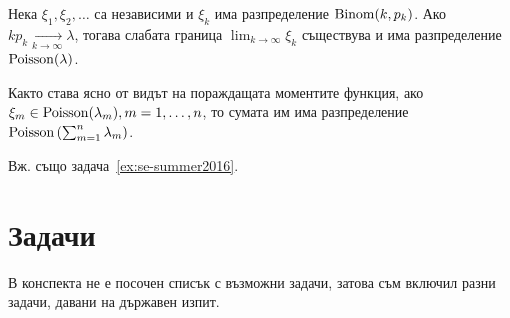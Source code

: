 \documentclass[numbers=endperiod, DIV=15, bibliography=totocnumbered]{scrartcl}
\begin{document}
\begin{theorem}[Поасон]\label{thm:poisson}
  Нека $\xi_1, \xi_2, \ldots$ са независими и $\xi_k$ има разпределение $\operatorname{Binom}(k, p_k)$. Ако $k p_k \underset {k \to \infty} \longrightarrow \lambda$, тогава слабата граница $\lim_{k \to \infty} \xi_k$ съществува и има разпределение $\operatorname{Poisson}(\lambda)$.
\end{theorem}

Както става ясно от видът на пораждащата моментите функция, ако $\xi_m \in \operatorname{Poisson}(\lambda_m), m = 1, \ldots, n$, то сумата им има разпределение $\operatorname{Poisson}\left(\sum_{m=1}^n \lambda_m \right)$.

Вж. също задача~\ref{ex:se-summer2016}.

\section{Задачи}

В конспекта не е посочен списък с възможни задачи, затова съм включил разни задачи, давани на държавен изпит.
\end{document}
